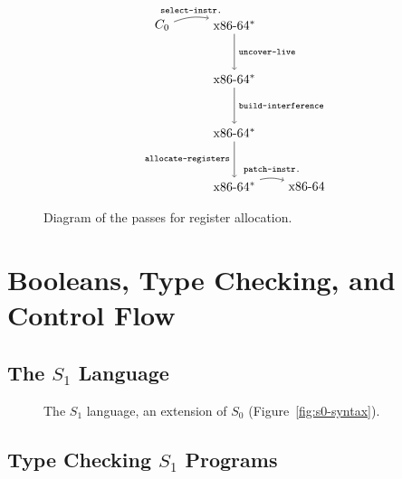 \documentclass[12pt]{book}
\begin{document}
\begin{figure}[tbp]
\[
\begin{tikzpicture}[baseline=(current  bounding  box.center)]
\node (1) at (-2,0)     {$C_0$};
\node (2)  at (0,0)     {$\text{x86-64}^{*}$};
\node (3)  at (0,-1.5)  {$\text{x86-64}^{*}$};
\node (4)  at (0,-3)    {$\text{x86-64}^{*}$};
\node (5)  at (0,-4.5)  {$\text{x86-64}^{*}$};
\node (6)  at (2,-4.5)  {$\text{x86-64}$};

\path[->,bend left=15] (1) edge [above] node {\ttfamily\scriptsize select-instr.}      (2);
\path[->,            ] (2) edge [right] node {\ttfamily\scriptsize uncover-live}       (3);
\path[->,            ] (3) edge [right] node {\ttfamily\scriptsize build-interference} (4);
\path[->,            ] (4) edge [left]  node {\ttfamily\scriptsize allocate-registers} (5);
\path[->,bend left=15] (5) edge [above] node {\ttfamily\scriptsize patch-instr.}       (6);
\end{tikzpicture}
\]
\caption{Diagram of the passes for register allocation.}
\label{fig:reg-alloc-passes}
\end{figure}


\chapter{Booleans, Type Checking, and Control Flow}
\label{ch:bool-types}

\section{The $S_1$ Language}

\begin{figure}[htbp]
\centering
{}
\caption{The $S_1$ language, an extension of $S_0$
  (Figure~\ref{fig:s0-syntax}).}
\label{fig:s1-syntax}
\end{figure}

\section{Type Checking $S_1$ Programs}
\end{document}

